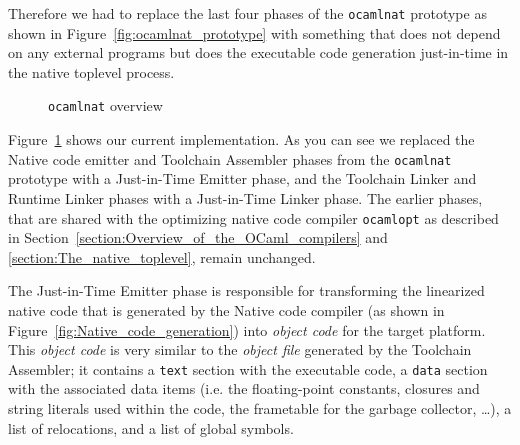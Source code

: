 \documentclass[10pt,a4paper,draft,twocolumn]{article}
\makeatletter
\newcommand{\ie}{i.e.\@\xspace}
\makeatother
\begin{document}
Therefore we had to replace the last four phases of the \texttt{ocamlnat} prototype as shown in
Figure~\ref{fig:ocamlnat_prototype} with something that does not depend on any external programs
but does the executable code generation just-in-time in the native toplevel process.

\begin{figure}[htb]
  \centering
  \caption{\texttt{ocamlnat} overview}
  \label{fig:ocamlnat_overview}
\end{figure}

Figure~\ref{fig:ocamlnat_overview} shows our current implementation. As you can see we replaced
the Native code emitter and Toolchain Assembler phases from the \texttt{ocamlnat} prototype with
a Just-in-Time Emitter phase, and the Toolchain Linker and Runtime Linker phases with a Just-in-Time
Linker phase. The earlier phases, that are shared with the optimizing native code compiler
\texttt{ocamlopt} as described in Section~\ref{section:Overview_of_the_OCaml_compilers} and
\ref{section:The_native_toplevel}, remain unchanged.

The Just-in-Time Emitter phase is responsible for transforming the linearized native code that is
generated by the Native code compiler (as shown in Figure~\ref{fig:Native_code_generation}) into
\emph{object code} for the target platform. This \emph{object code} is very similar to the \emph{object
file} generated by the Toolchain Assembler; it contains a \texttt{text} section with the executable
code, a \texttt{data} section with the associated data items (\ie the floating-point constants, closures
and string literals used within the code, the frametable for the garbage collector, \ldots), a list
of relocations, and a list of global symbols.
\end{document}
